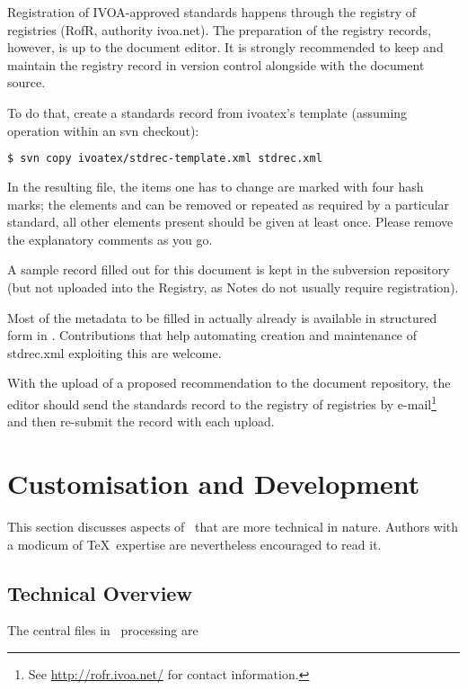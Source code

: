 \documentclass[11pt,a4paper]{ivoa}
\begin{document}
Registration of IVOA-approved standards happens through the registry of
registries (RofR, authority ivoa.net).  The preparation of the registry
records, however, is up to the document editor.  It is strongly
recommended to keep and maintain the registry record in version control
alongside with the document source.

To do that, create a standards record from ivoatex's template (assuming
operation within an svn checkout):

\begin{lstlisting}[language=sh]
$ svn copy ivoatex/stdrec-template.xml stdrec.xml
\end{lstlisting}

In the resulting file, the items one has to change are marked with four
hash marks; the elements  and  can be removed
or repeated as required by a particular standard, all other elements
present should be given at least once.  Please remove the explanatory
comments as you go. 

A sample record filled out for this document is kept in the subversion
repository (but not uploaded into the Registry, as Notes do not usually
require registration).

Most of the metadata to be filled in actually already is available in
structured form in \ivoatex.  Contributions that help automating
creation and maintenance of stdrec.xml exploiting this are welcome.

With the upload of a proposed recommendation to the document repository,
the editor should send the standards record to the registry of
registries by e-mail\footnote{See \url{http://rofr.ivoa.net/} for
contact information.} and then re-submit the record with each upload.

\section{Customisation and Development}
\label{sect:impl}

This section discusses aspects of \ivoatex\ that are more technical in
nature.  Authors with a modicum of \TeX\ expertise are nevertheless
encouraged to read it.

\subsection{Technical Overview}

The central files in \ivoatex\ processing are
\end{document}
